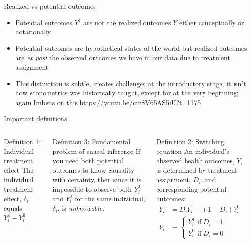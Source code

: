 \documentclass{beamer}
\begin{document}
\begin{frame}{Realized vs potential outcomes}

  \begin{itemize}
    \item Potential outcomes $Y^1$ are not the realized outcomes $Y$ either conceptually or notationally
    \item Potential outcomes are hypothetical states of the world but realized outcomes are \emph{ex post} the observed outcomes we have in our data due to treatment assignment
    \item This distinction is subtle, creates challenges at the introductory stage, it isn't how econometrics was historically taught, except for at the very beginning; again Imbens on this \url{https://youtu.be/cm8V65AS5iU?t=1175}
  \end{itemize}
\end{frame}



\begin{frame}{Important definitions}


  \begin{columns}[t]
    \scriptsize

    \begin{block}{Definition 1: Individual treatment effect}
      The individual treatment effect,  $\delta_i$, equals $Y_i^1-Y_i^0$
    \end{block}
    \begin{block}{Definition 3: Fundamental problem of causal inference}
      If you need both potential outcomes to know causality with certainty, then since it is impossible to observe both $Y_i^1$ and $Y_i^0$ for the same individual, $\delta_i$, is \emph{unknowable}.
    \end{block}
    \begin{block}{Definition 2: Switching equation}
      An individual's observed health outcomes, $Y$, is determined by treatment assignment, $D_i$, and corresponding potential outcomes:
      \begin{eqnarray*}
        Y_i& = D_iY^1_i+(1-D_i)Y^0_i& \\
        Y_i& = \begin{cases}
          Y^1_i\text{ if }D_i=1 \\
          Y^0_i\text{ if }D_i=0
        \end{cases}
      \end{eqnarray*}
    \end{block}

  \end{columns}
\end{frame}
\end{document}
